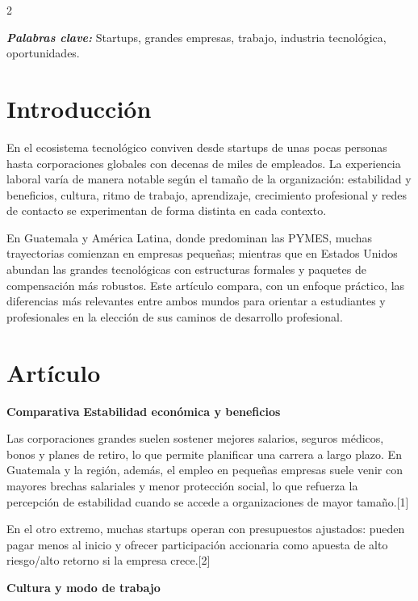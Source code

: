 \documentclass[12pt,spanish,Letterpaper,openany]{book}
\begin{document}
\begin {multicols}{2}

\textbf{\emph{Palabras clave:}} Startups, grandes empresas, trabajo, industria tecnológica, oportunidades.

\section{Introducción}\label{introducciuxf3n-7}

En el ecosistema tecnológico conviven desde startups de unas pocas personas hasta corporaciones globales con decenas de miles de empleados. La experiencia laboral varía de manera notable según el tamaño de la organización: estabilidad y beneficios, cultura, ritmo de trabajo, aprendizaje, crecimiento profesional y redes de contacto se experimentan de forma distinta en cada contexto.

En Guatemala y América Latina, donde predominan las PYMES, muchas trayectorias comienzan en empresas pequeñas; mientras que en Estados Unidos abundan las grandes tecnológicas con estructuras formales y paquetes de compensación más robustos. Este artículo compara, con un enfoque práctico, las diferencias más relevantes entre ambos mundos para orientar a estudiantes y profesionales en la elección de sus caminos de desarrollo profesional.

\section{Artículo}\label{artuxedculo-7}

\bigskip

\textbf{Comparativa}
\textbf{Estabilidad económica y beneficios}

Las corporaciones grandes suelen sostener mejores salarios, seguros médicos, bonos y planes de retiro, lo que permite planificar una carrera a largo plazo. En Guatemala y la región, además, el empleo en pequeñas empresas suele venir con mayores brechas salariales y menor protección social, lo que refuerza la percepción de estabilidad cuando se accede a organizaciones de mayor tamaño.{[}1{]}

En el otro extremo, muchas startups operan con presupuestos ajustados: pueden pagar menos al inicio y ofrecer participación accionaria como apuesta de alto riesgo/alto retorno si la empresa crece.{[}2{]}

\bigskip

\textbf{Cultura y modo de trabajo}


\end{multicols}
\end{document}
